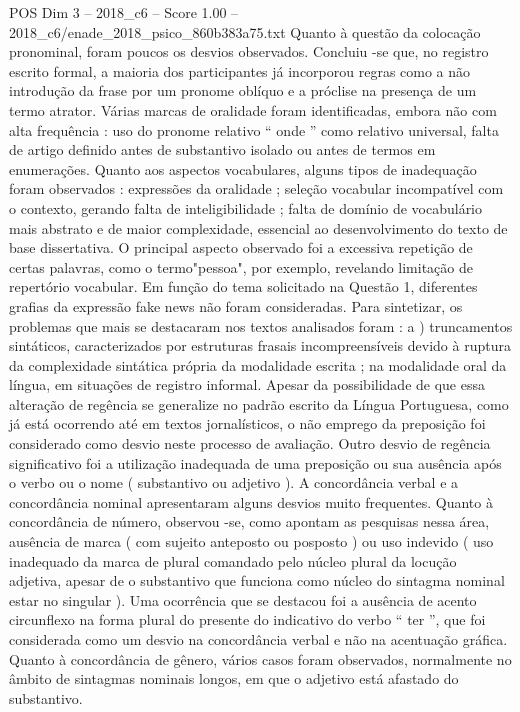 \begin{textsample}{POS Dim 3 – 2018\_c6 – Score 1.00 – 2018\_c6/enade\_2018\_psico\_860b383a75.txt}
Quanto à questão da colocação pronominal, foram poucos os desvios observados.
Concluiu -se que, no registro escrito formal, a maioria dos participantes já incorporou regras como a não introdução da frase por um pronome oblíquo e a próclise na presença de um termo atrator.
Várias marcas de oralidade foram identificadas, embora não com alta frequência : uso do pronome relativo “ onde ” como relativo universal, falta de artigo definido antes de substantivo isolado ou antes de termos em enumerações.
Quanto aos aspectos vocabulares, alguns tipos de inadequação foram observados : expressões da oralidade ; seleção vocabular incompatível com o contexto, gerando falta de inteligibilidade ; falta de domínio de vocabulário mais abstrato e de maior complexidade, essencial ao desenvolvimento do texto de base dissertativa.
O principal aspecto observado foi a excessiva repetição de certas palavras, como o termo"pessoa", por exemplo, revelando limitação de repertório vocabular.
Em função do tema solicitado na Questão 1, diferentes grafias da expressão fake news não foram consideradas.
Para sintetizar, os problemas que mais se destacaram nos textos analisados foram : a ) truncamentos sintáticos, caracterizados por estruturas frasais incompreensíveis devido à ruptura da complexidade sintática própria da modalidade escrita ; na modalidade oral da língua, em situações de registro informal.
Apesar da possibilidade de que essa alteração de regência se generalize no padrão escrito da Língua Portuguesa, como já está ocorrendo até em textos jornalísticos, o não emprego da preposição foi considerado como desvio neste processo de avaliação.
Outro desvio de regência significativo foi a utilização inadequada de uma preposição ou sua ausência após o verbo ou o nome ( substantivo ou adjetivo ).
A concordância verbal e a concordância nominal apresentaram alguns desvios muito frequentes.
Quanto à concordância de número, observou -se, como apontam as pesquisas nessa área, ausência de marca ( com sujeito anteposto ou posposto ) ou uso indevido ( uso inadequado da marca de plural comandado pelo núcleo plural da locução adjetiva, apesar de o substantivo que funciona como núcleo do sintagma nominal estar no singular ).
Uma ocorrência que se destacou foi a ausência de acento circunflexo na forma plural do presente do indicativo do verbo “ ter ”, que foi considerada como um desvio na concordância verbal e não na acentuação gráfica.
Quanto à concordância de gênero, vários casos foram observados, normalmente no âmbito de sintagmas nominais longos, em que o adjetivo está afastado do substantivo.

\end{textsample}
